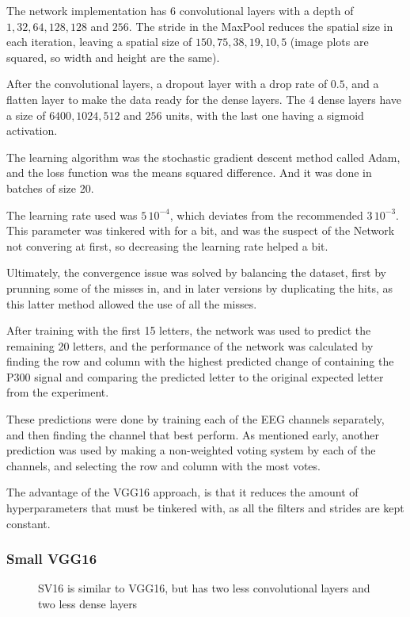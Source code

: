 \documentclass[conference]{IEEEtran}
\begin{document}
The network implementation has $6$ convolutional layers with a depth of $1, 32, 64, 128, 128$ and $256$. The stride in the MaxPool reduces the spatial size in each iteration, leaving a spatial size of $150, 75, 38, 19, 10, 5$ (image plots are squared, so width and height are the same). 

After the convolutional layers, a dropout layer with a drop rate of $0.5$, and a flatten layer to make the data ready for the dense layers. The $4$ dense layers have a size of $6400, 1024, 512$ and $256$ units, with the last one having a sigmoid activation.

The learning algorithm was the stochastic gradient descent method called Adam\cite{adam2014}, and the loss function was the means squared difference. And it was done in batches of size 20. 

The learning rate used was $5\,10^{-4}$, which deviates from the recommended $3\, 10^{-3}$. This parameter was tinkered with for a bit, and was the suspect of the Network not convering at first, so decreasing the learning rate helped a bit.

Ultimately, the convergence issue was solved by balancing the dataset, first by prunning some of the misses in, and in later versions by duplicating the hits, as this latter method allowed the use of all the misses.

After training with the first 15 letters, the network was used to predict the remaining 20 letters, and the performance of the network was calculated by finding the row and column with the highest predicted change of containing the P300 signal and comparing the predicted letter to the original expected letter from the experiment.

These predictions were done by training each of the EEG channels separately, and then finding the channel that best perform. As mentioned early, another prediction was used by making a non-weighted voting system by each of the channels, and selecting the row and column with the most votes.

The advantage of the VGG16 approach, is that it reduces the amount of hyperparameters that must be tinkered with, as all the filters and strides are kept constant. 

\subsubsection{Small VGG16}
\begin{figure*}[h]
\centering

\caption[SVG16 Neural Network]{SV16 is similar to VGG16, but has two less convolutional layers and two less dense layers}
\label{fig:nnv2}
\end{figure*}
\end{document}
